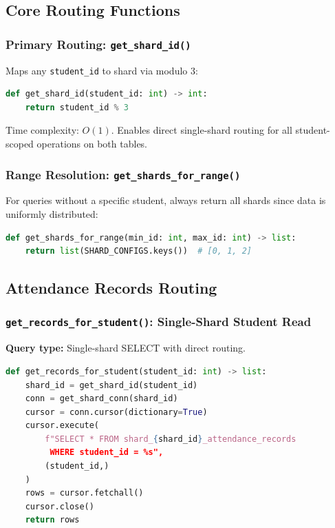 \documentclass[conference]{IEEEtran}
\begin{document}
\subsection{Core Routing Functions}

\subsubsection{Primary Routing: \texttt{get\_shard\_id()}}

Maps any \texttt{student\_id} to shard via modulo 3:

\begin{lstlisting}[language=Python]
def get_shard_id(student_id: int) -> int:
    return student_id % 3
\end{lstlisting}

Time complexity: $O(1)$. Enables direct single-shard routing for all student-scoped operations on both tables.

\subsubsection{Range Resolution: \texttt{get\_shards\_for\_range()}}

For queries without a specific student, always return all shards since data is uniformly distributed:

\begin{lstlisting}[language=Python]
def get_shards_for_range(min_id: int, max_id: int) -> list:
    return list(SHARD_CONFIGS.keys())  # [0, 1, 2]
\end{lstlisting}

\subsection{Attendance Records Routing}

\subsubsection{\texttt{get\_records\_for\_student()}: Single-Shard Student Read}

\textbf{Query type:} Single-shard SELECT with direct routing.

\begin{lstlisting}[language=Python]
def get_records_for_student(student_id: int) -> list:
    shard_id = get_shard_id(student_id)
    conn = get_shard_conn(shard_id)
    cursor = conn.cursor(dictionary=True)
    cursor.execute(
        f"SELECT * FROM shard_{shard_id}_attendance_records 
         WHERE student_id = %s",
        (student_id,)
    )
    rows = cursor.fetchall()
    cursor.close()
    return rows
\end{lstlisting}
\end{document}
